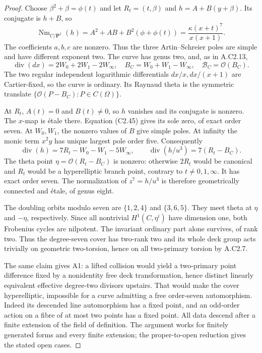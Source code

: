 \begin{proof}
Choose $\beta^2+\beta=\phi(t)$ and let
$R_t=(t,\beta)$ and $h=A+B(y+\beta)$. Its conjugate is
$h+B$, so
\[
       \operatorname{Nm}_{C/\mathbf P^1}(h)
          =A^2+AB+B^2(\phi+\phi(t))
          =\frac{\kappa(x+t)^7}{x(x+1)}.                         \tag{C2.45}
\]
The coefficients $a,b,c$ are nonzero. Thus the three
Artin--Schreier poles are simple and have different
exponent two. The curve has genus two, and, as in A.C2.13,
\[
 \operatorname{div}(dx)=2W_0+2W_1-2W_\infty,\quad
 B_C=W_0+W_1-W_\infty,\quad
 \mathcal B_C=\mathcal O(B_C).
\]
The two regular independent logarithmic differentials
$dx/x,dx/(x+1)$ are Cartier-fixed, so the curve is ordinary.
Its Raynaud theta is the symmetric translate
$\{\mathcal O(P-B_C):P\in C(\Omega)\}$.

At $R_t$, $A(t)=0$ and $B(t)\ne0$, so $h$ vanishes
and its conjugate is nonzero. The $x$-map is \'etale there.
Equation (C2.45) gives its sole zero, of exact order seven.
At $W_0,W_1$, the nonzero values of $B$ give simple poles.
At infinity the monic term $x^2y$ has unique largest
pole order five. Consequently
\[
 \operatorname{div}(h)=7R_t-W_0-W_1-5W_\infty,\qquad
 \operatorname{div}(h/u^3)=7(R_t-B_C).                           \tag{C2.46}
\]
The theta point $\eta=\mathcal O(R_t-B_C)$ is nonzero:
otherwise $2R_t$ would be canonical and $R_t$ would be
a hyperelliptic branch point, contrary to $t\ne0,1,\infty$.
It has exact order seven. The normalization of
$z^7=h/u^3$ is therefore geometrically connected and
\'etale, of genus eight.

The doubling orbits modulo seven are $\{1,2,4\}$ and
$\{3,6,5\}$. They meet theta at $\eta$ and $-\eta$,
respectively. Since all nontrivial $H^1(C,\eta^i)$ have
dimension one, both Frobenius cycles are nilpotent.
The invariant ordinary part alone survives, of rank two.
Thus the degree-seven cover has two-rank two and its
whole deck group acts trivially on geometric two-torsion,
hence on all two-primary torsion by A.C2.7.

The same claim gives A1: a lifted collision would yield
a two-primary point difference fixed by a nonidentity
free deck transformation, hence distinct linearly
equivalent effective degree-two divisors upstairs.
That would make the cover hyperelliptic, impossible
for a curve admitting a free order-seven automorphism.
Indeed its descended line automorphism has a fixed
point, and an odd-order action on a fibre of at most
two points has a fixed point. All data descend after
a finite extension of the field of definition.
The argument works for finitely generated forms and
every finite extension; the proper-to-open reduction
gives the stated open cases.


\end{proof}
